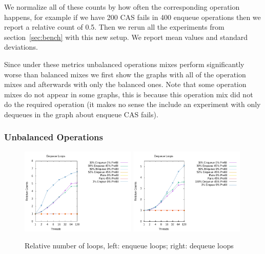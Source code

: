 \documentclass{article}      %
\begin{document}
We normalize all of these counts by how often the corresponding operation happens, for example if we have 200 CAS fails in 400 enqueue operations then we report a relative count of 0.5. Then we rerun all the experiments from section~\ref{sec:bench} with this new setup. We report mean values and standard deviations.

Since under these metrics unbalanced operations mixes perform significantly worse than balanced mixes we first show the graphs with all of the operation mixes and afterwards with only the balanced ones.  Note that some operation mixes do not appear in some graphs, this is because this operation mix did not do the required operation (it makes no sense the include an experiment with only dequeues in the graph about enqueue CAS fails).

\subsubsection{Unbalanced Operations}

\begin{figure}[H]
	\centering
	\includegraphics[width=0.49\textwidth]{Pictures/diss_enq_loops.png}
	\includegraphics[width=0.49\textwidth]{Pictures/diss_deq_loops.png}
	\caption{Relative number of loops, left: enqueue loops; right: dequeue loops}
	\label{fig:diss_loops}
\end{figure}
\end{document}
